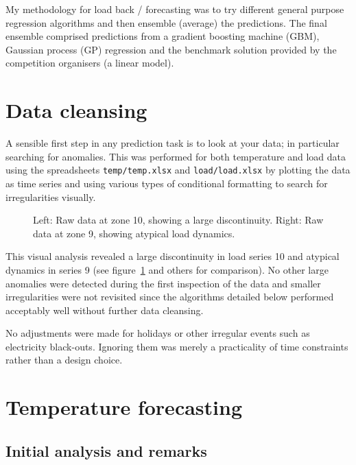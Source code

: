 My methodology for load back / forecasting was to try different general purpose regression algorithms and then ensemble (average) the predictions.
The final ensemble comprised predictions from a gradient boosting machine (GBM), Gaussian process (GP) regression and the benchmark solution provided by the competition organisers (a linear model).

\section{Data cleansing}

\label{sec:cleans}

A sensible first step in any prediction task is to look at your data; in particular searching for anomalies.
This was performed for both temperature and load data using the spreadsheets \texttt{temp/temp.xlsx} and \texttt{load/load.xlsx} by plotting the data as time series and using various types of conditional formatting to search for irregularities visually.

\begin{figure}[ht]
  \begin{center}
    
  \end{center}
  \caption[Examples of unusual load dynamics,]{Left: Raw data at zone 10, showing a large discontinuity. Right: Raw data at zone 9, showing atypical load dynamics.}
  \label{fig:load}
\end{figure}

This visual analysis revealed a large discontinuity in load series 10 and atypical dynamics in series 9 (see figure~\ref{fig:load} and others for comparison).
No other large anomalies were detected during the first inspection of the data and smaller irregularities were not revisited since the algorithms detailed below performed acceptably well without further data cleansing.

No adjustments were made for holidays or other irregular events such as electricity black-outs.
Ignoring them was merely a practicality of time constraints rather than a design choice.

\section{Temperature forecasting}

\label{sec:temp}

\subsection{Initial analysis and remarks}

